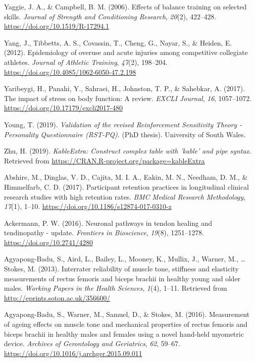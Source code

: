 \documentclass[
  english,
  man,floatsintext]{apa6}
\begin{document}
\leavevmode\hypertarget{ref-Yaggie2006}{}%
Yaggie, J. A., \& Campbell, B. M. (2006). Effects of balance training on selected skills. \emph{Journal of Strength and Conditioning Research}, \emph{20}(2), 422--428. \url{https://doi.org/10.1519/R-17294.1}

\leavevmode\hypertarget{ref-Yang2012}{}%
Yang, J., Tibbetts, A. S., Covassin, T., Cheng, G., Nayar, S., \& Heiden, E. (2012). Epidemiology of overuse and acute injuries among competitive collegiate athletes. \emph{Journal of Athletic Training}, \emph{47}(2), 198--204. \url{https://doi.org/10.4085/1062-6050-47.2.198}

\leavevmode\hypertarget{ref-Yaribeygi2017}{}%
Yaribeygi, H., Panahi, Y., Sahraei, H., Johnston, T. P., \& Sahebkar, A. (2017). The impact of stress on body function: A review. \emph{EXCLI Journal}, \emph{16}, 1057--1072. \url{https://doi.org/10.17179/excli2017-480}

\leavevmode\hypertarget{ref-Young2019}{}%
Young, T. (2019). \emph{Validation of the revised Reinforcement Sensitivity Theory - Personality Questionnaire (RST-PQ).} (PhD thesis). University of South Wales.

\leavevmode\hypertarget{ref-R-kableExtra}{}%
Zhu, H. (2019). \emph{KableExtra: Construct complex table with 'kable' and pipe syntax}. Retrieved from \url{https://CRAN.R-project.org/package=kableExtra}

\leavevmode\hypertarget{ref-Abshire2017}{}%
Abshire, M., Dinglas, V. D., Cajita, M. I. A., Eakin, M. N., Needham, D. M., \& Himmelfarb, C. D. (2017). Participant retention practices in longitudinal clinical research studies with high retention rates. \emph{BMC Medical Research Methodology}, \emph{17}(1), 1--10. \url{https://doi.org/10.1186/s12874-017-0310-z}

\leavevmode\hypertarget{ref-AckermannPaul2016}{}%
Ackermann, P. W. (2016). Neuronal pathways in tendon healing and tendinopathy - update. \emph{Frontiers in Bioscience}, \emph{19}(8), 1251--1278. \url{https://doi.org/10.2741/4280}

\leavevmode\hypertarget{ref-Agyapong-Badu2013}{}%
Agyapong-Badu, S., Aird, L., Bailey, L., Mooney, K., Mullix, J., Warner, M., \ldots{} Stokes, M. (2013). Interrater reliability of muscle tone, stiffness and elasticity measurements of rectus femoris and biceps brachii in healthy young and older males. \emph{Working Papers in the Health Sciences}, \emph{1}(4), 1--11. Retrieved from \url{http://eprints.soton.ac.uk/356600/}

\leavevmode\hypertarget{ref-Agyapong-Badu2016}{}%
Agyapong-Badu, S., Warner, M., Samuel, D., \& Stokes, M. (2016). Measurement of ageing effects on muscle tone and mechanical properties of rectus femoris and biceps brachii in healthy males and females using a novel hand-held myometric device. \emph{Archives of Gerontology and Geriatrics}, \emph{62}, 59--67. \url{https://doi.org/10.1016/j.archger.2015.09.011}
\end{document}
